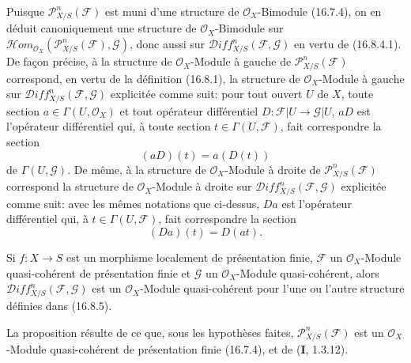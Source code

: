 \begin{env}[16.8.5]
\label{IV.16.8.5}
Puisque $\mathscr{P}_{X/S}^n(\mathscr{F})$ est muni d'une structure de
$\mathcal{O}_X$-Bimodule (16.7.4), on en déduit canoniquement une structure de
$\mathcal{O}_X$-Bimodule sur
$\mathscr{H}\!om_{\mathcal{O}_X}
(\mathscr{P}_{X/S}^n(\mathscr{F}),\mathscr{G})$, donc aussi sur
$\mathscr{D}\!iff_{X/S}^n(\mathscr{F},\mathscr{G})$ en vertu de (16.8.4.1).
De façon précise, à la structure de $\mathcal{O}_X$-Module à gauche de
$\mathscr{P}_{X/S}^n(\mathscr{F})$ correspond, en vertu de la définition
(16.8.1), la structure de $\mathcal{O}_X$-Module à gauche sur
$\mathscr{D}\!iff_{X/S}^n(\mathscr{F},\mathscr{G})$ explicitée comme suit:
pour tout ouvert $U$ de $X$, toute section
$a\in\Gamma(U,\mathcal{O}_X)$ et tout opérateur différentiel
$D:\mathscr{F}|U\to\mathscr{G}|U$, $aD$ est l'opérateur différentiel qui, à
toute section $t\in\Gamma(U,\mathscr{F})$, fait correspondre la section
\[
  (aD)(t)=a(D(t))
  \tag{16.8.5.1}
  \label{IV.16.8.5.1}
\]
de $\Gamma(U,\mathscr{G})$. De même, à la structure de
$\mathcal{O}_X$-Module à droite de $\mathscr{P}_{X/S}^n(\mathscr{F})$
correspond la structure de $\mathcal{O}_X$-Module à droite sur
$\mathscr{D}\!iff_{X/S}^n(\mathscr{F},\mathscr{G})$ explicitée comme suit:
avec les mêmes notations que ci-dessus, $Da$ est l'opérateur différentiel qui,
à $t\in\Gamma(U,\mathscr{F})$, fait correspondre la section
\[
  (Da)(t)=D(at).
  \tag{16.8.5.2}
  \label{IV.16.8.5.2}
\]
\end{env}

\begin{proposition}[16.8.6]
\label{IV.16.8.6}
Si $f:X\to S$ est un morphisme localement de présentation finie,
$\mathscr{F}$ un $\mathcal{O}_X$-Module quasi-cohérent de présentation finie
et $\mathscr{G}$ un $\mathcal{O}_X$-Module quasi-cohérent, alors
$\mathscr{D}\!iff_{X/S}^n(\mathscr{F},\mathscr{G})$ est un
$\mathcal{O}_X$-Module quasi-cohérent pour l'une ou l'autre structure définies
dans \textup{(16.8.5)}.
\end{proposition}

La proposition résulte de ce que, sous les hypothèses faites,
$\mathscr{P}_{X/S}^n(\mathscr{F})$ est un $\mathcal{O}_X$-Module
quasi-cohérent de présentation finie (16.7.4), et de (\textbf{I}, 1.3.12).


